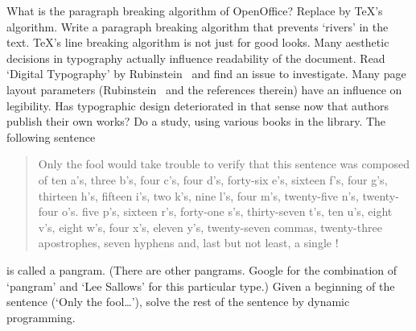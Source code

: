 \project What is the paragraph breaking algorithm of OpenOffice?
Replace by \TeX's algorithm.
\project Write a paragraph breaking algorithm that prevents `rivers'
in the text.
\project \TeX's line breaking algorithm is not just for good looks.
Many aesthetic decisions in typography actually influence readability
of the document.
Read `Digital Typography' by Rubinstein~\cite{Rubinstein:digital-typography}
and find an issue to investigate.
\project Many page layout parameters 
(Rubinstein~\cite{Rubinstein:digital-typography} and the references 
therein) have an influence on legibility. Has typographic design deteriorated
in that sense now that authors publish their own works?
Do a study, using various books in the library.
\project The following sentence
\begin{quote}
Only the fool would take trouble to verify that this sentence was
composed of ten a's, three b's, four c's, four d's, forty-six e's,
sixteen f's, four g's, thirteen h's, fifteen i's, two k's, nine l's,
four m's, twenty-five n's, twenty-four o's. five p's, sixteen r's,
forty-one s's, thirty-seven t's, ten u's, eight v's, eight w's, four
x's, eleven y's, twenty-seven commas, twenty-three apostrophes, seven
hyphens and, last but not least, a single !
\end{quote}
is called a pangram. (There are other pangrams.
Google for the combination of `pangram' and `Lee Sallows'
for this particular type.)
Given a beginning of the sentence (`Only the fool\dots'), solve the rest of the 
sentence by dynamic programming.
